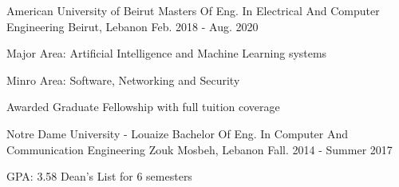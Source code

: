 

\begin{cventries}

  \cventry
    {American University of Beirut} %
    {Masters Of Eng. In Electrical And Computer Engineering} %
    {Beirut, Lebanon} %
    {Feb. 2018 - Aug. 2020} %
    {
      \begin{cvitems} %
        \item Major Area: Artificial Intelligence and Machine Learning systems
        \item Minro Area: Software, Networking and Security
        \item {Awarded Graduate Fellowship with full tuition coverage }
      \end{cvitems}
    }

  \cventry
    {Notre Dame University - Louaize} %
    {Bachelor Of Eng. In Computer And Communication Engineering} %
    {Zouk Mosbeh, Lebanon} %
    {Fall. 2014 - Summer 2017} %
    {
      \begin{cvitems} %
        \item {GPA: 3.58 Dean’s List for 6 semesters}
      \end{cvitems}
    }




\end{cventries}
